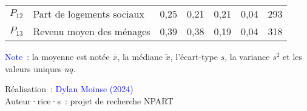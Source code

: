 \begin{table}[h!]
{\begin{tabular}{p{}p{}p{}p{}p{}p{}p{}}
\small{\(P_{12}\)} & \small{Part de logements sociaux} & \small{0,25} & \small{0,21} & \small{0,21} & \small{0,04} & \small{293}\\
\small{\(P_{13}\)} & \small{Revenu moyen des ménages} & \small{0,39} & \small{0,38} & \small{0,19} & \small{0,04} & \small{318}\\
        \hline
    \end{tabular}}
    \caption*{}
    \vspace{5pt}
        \begin{flushleft}\scriptsize{
        \textcolor{blue}{Note~:} la moyenne est notée \(\bar{x}\), la médiane \(\tilde{x}\), l'écart-type \(s\), la variance \(s^2\) et les valeurs uniques \(uq\).
        }\end{flushleft}
        \begin{flushright}\scriptsize
        Réalisation~: \textcolor{blue}{Dylan Moinse (2024)}
        \\
        Auteur·rice·s~: projet de recherche \acrshort{NPART}
        \end{flushright}
        \end{table}